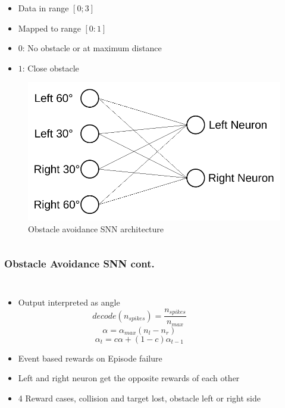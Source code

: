 \begin{frame}
\begin{columns}
\begin{overprint}
\begin{figure}
				\end{figure}
				\begin{itemize}
					\item Data in range $[0;3]$
					\item Mapped to range $[0:1]$
					\item $0$: No obstacle or at maximum distance
					\item $1$: Close obstacle
				\end{itemize}
				\begin{figure}
					\centering
					\includegraphics[width=\textwidth]{img/arch_oa.pdf}
					\caption{Obstacle avoidance SNN architecture}
					\label{fig:arch_oa}
				\end{figure}
			\end{overprint}
	\end{columns}
\end{frame}

\begin{frame}
	\frametitle{Obstacle Avoidance SNN cont.}
	\begin{columns}
		\column{\linewidth}
			\begin{itemize}
				\item <1-> Output interpreted as angle
				\[decode\left(n_{spikes}\right) = \frac{n_{spikes}}{n_{max}}\]
				\[\alpha = \alpha_{max} \left(n_l - n_r\right)\]
				\[\alpha_t = c \alpha + \left(1 - c\right) \alpha_{t-1}\]
				\item <2-> Event based rewards on Episode failure
				\item <2-> Left and right neuron get the opposite rewards of each other
				\item <2-> 4 Reward cases, collision and target lost, obstacle left or right side
			\end{itemize}			
	\end{columns}
\end{frame}

